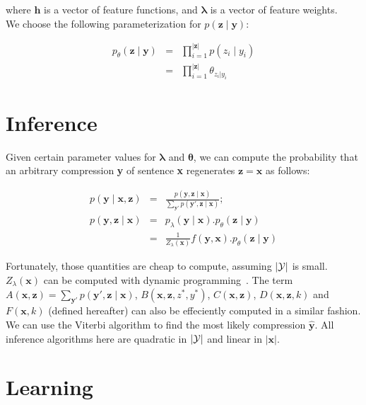 \documentclass[11pt,onecolumn]{article}
\begin{document}
where $\mathbf{h}$ is a vector of feature functions, and $\boldsymbol{\lambda}$ is a vector of feature weights.\\

We choose the following parameterization for $p(\mathbf{z} \mid \mathbf{y})$:

\begin{eqnarray}
p_\theta(\mathbf{z} \mid \mathbf{y}) &=& \prod_{i=1}^{|\mathbf{z}|} p(z_i\mid y_i) \\
 &=& \prod_{i=1}^{|\mathbf{z}|} \theta_{z_i|y_i}
\end{eqnarray}

\section{Inference}
\label{sec:inference}
Given certain parameter values for $\boldsymbol{\lambda}$ and $\boldsymbol{\theta}$, we can compute the probability that an arbitrary compression \textbf{y} of sentence \textbf{x} regenerates $\mathbf{z} = \mathbf{x}$ as follows:

\begin{eqnarray}
p(\mathbf{y}\mid\mathbf{x}, \mathbf{z}) &=& \frac{p(\mathbf{y}, \mathbf{z} \mid \mathbf{x})}{\sum_{\mathbf{y'}} p(\mathbf{y'}, \mathbf{z} \mid \mathbf{x})}; \\
p(\mathbf{y}, \mathbf{z} \mid \mathbf{x}) &=& p_\lambda(\mathbf{y}\mid\mathbf{x}).p_\theta(\mathbf{z}\mid\mathbf{y}) \\
&=& \frac{1}{Z_\lambda(\mathbf{x})}f(\mathbf{y}, \mathbf{x}).p_\theta(\mathbf{z}\mid\mathbf{y})
\end{eqnarray}

Fortunately, those quantities are cheap to compute, assuming $|\cal{Y}|$ is small. $Z_\lambda(\mathbf{x})$ can be computed with dynamic programming~\cite{sha:03}. The term $A(\mathbf{x},\mathbf{z}) = \sum_{\mathbf{y'}} p(\mathbf{y'}, \mathbf{z} \mid \mathbf{x})$, $B(\mathbf{x}, \mathbf{z}, z^*, y^*)$, $C(\mathbf{x}, \mathbf{z})$, $D(\mathbf{x}, \mathbf{z}, k)$ and $F(\mathbf{x}, k)$ (defined hereafter) can also be effeciently computed in a similar fashion. We can use the Viterbi algorithm to find the most likely compression $\hat{\mathbf{y}}$. All inference algorithms here are quadratic in $|\cal{Y}|$ and linear in $|\mathbf{x}|$.

\section{Learning}
\end{document}
